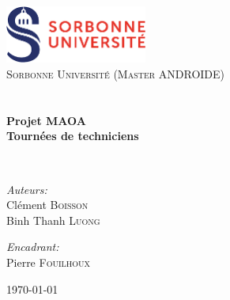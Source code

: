 
\begin{titlepage}
\begin{center}

\includegraphics[width=0.35\textwidth]{pictures/logo.jpg}~\\[1cm]

\textsc{\LARGE Sorbonne Université (Master ANDROIDE)}\\[1.5cm]

\textsc{\Large }\\[0.5cm]

\HRule \\[0.4cm]

{\huge \bfseries Projet MAOA\\
Tournées de techniciens \\[0.4cm] }

\HRule \\[1.5cm]

\begin{minipage}{0.4\textwidth}
\begin{flushleft} \large
\emph{Auteurs:}\\
Clément \textsc{Boisson}\\
Binh Thanh \textsc{Luong}
\end{flushleft}
\end{minipage}
\begin{minipage}{0.4\textwidth}
\begin{flushright} \large
\emph{Encadrant:} \\
Pierre \textsc{Fouilhoux}\\
\end{flushright}
\end{minipage}

\vfill

{\large \today}

\end{center}
\end{titlepage}